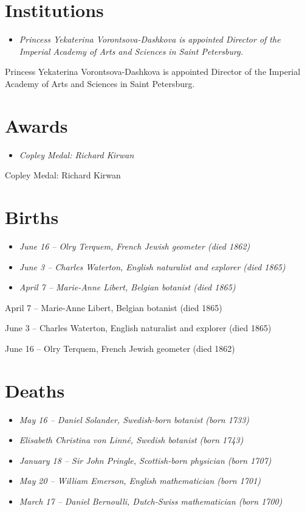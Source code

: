 \section{Institutions}\label{institutions}

\begin{itemize}
\item
  \emph{Princess Yekaterina Vorontsova-Dashkova is appointed Director of
  the Imperial Academy of Arts and Sciences in Saint Petersburg.}
\end{itemize}

Princess Yekaterina Vorontsova-Dashkova is appointed Director of the
Imperial Academy of Arts and Sciences in Saint Petersburg.

\section{Awards}\label{awards}

\begin{itemize}
\item
  \emph{Copley Medal: Richard Kirwan}
\end{itemize}

Copley Medal: Richard Kirwan

\section{Births}\label{births}

\begin{itemize}
\item
  \emph{June 16 -- Olry Terquem, French Jewish geometer (died 1862)}
\item
  \emph{June 3 -- Charles Waterton, English naturalist and explorer
  (died 1865)}
\item
  \emph{April 7 -- Marie-Anne Libert, Belgian botanist (died 1865)}
\end{itemize}

April 7 -- Marie-Anne Libert, Belgian botanist (died 1865)

June 3 -- Charles Waterton, English naturalist and explorer (died 1865)

June 16 -- Olry Terquem, French Jewish geometer (died 1862)

\section{Deaths}\label{deaths}

\begin{itemize}
\item
  \emph{May 16 -- Daniel Solander, Swedish-born botanist (born 1733)}
\item
  \emph{Elisabeth Christina von Linné, Swedish botanist (born 1743)}
\item
  \emph{January 18 -- Sir John Pringle, Scottish-born physician (born
  1707)}
\item
  \emph{May 20 -- William Emerson, English mathematician (born 1701)}
\item
  \emph{March 17 -- Daniel Bernoulli, Dutch-Swiss mathematician (born
  1700)}
\end{itemize}


